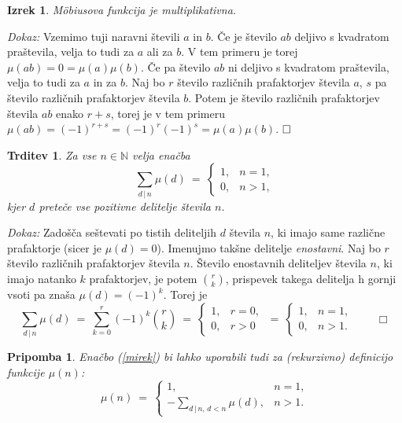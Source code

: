 \documentclass[a4paper,12pt]{article}
\def\N{\mathbb{N}} %
\def\qed{$\hfill\Box$}   %
\def\qedm{\qquad\Box}   %
\newtheorem{izrek}{Izrek}
\newtheorem{trditev}{Trditev}
\newtheorem{pripomba}{Pripomba}
\begin{document}
\begin{izrek}
\label{mimult}
M\"obiusova funkcija je multiplikativna.
\end{izrek}

\noindent
{\em Dokaz:\/} Vzemimo tuji naravni števili $a$ in $b$. Če je število $ab$ deljivo s kvadratom praštevila,
velja to tudi za $a$ ali za $b$. V tem primeru je torej $\mu(ab) = 0 = \mu(a)\mu(b)$.
Če pa število $ab$ ni deljivo s kvadratom praštevila, velja to tudi za $a$ in za $b$. Naj bo $r$ število različnih
prafaktorjev števila $a$, $s$ pa število različnih prafaktorjev števila $b$. Potem je število različnih 
prafaktorjev števila $ab$ enako $r+s$, torej je v tem primeru $\mu(ab) = (-1)^{r+s} = (-1)^r (-1)^s = \mu(a)\mu(b)$.
\qed


\begin{trditev}
Za vse $n \in \N$ velja enačba
\begin{equation}
\label{mirek}
\sum_{d\,|\,n} \mu(d)\ =\ \left\{
\begin{array}{ll}
1, & n = 1, \\
0, & n > 1,
\end{array}
\right.
\end{equation}
kjer $d$ preteče vse pozitivne delitelje števila $n$.
\end{trditev}

\noindent
{\em Dokaz:\/} 
Zadošča seštevati po tistih deliteljih $d$ števila $n$, ki imajo same različne prafaktorje (sicer je
$\mu(d) = 0$). Imenujmo takšne delitelje {\em enostavni}. Naj bo $r$ število različnih prafaktorjev
števila $n$. Število enostavnih deliteljev števila $n$, ki imajo natanko $k$ prafaktorjev, je potem ${r \choose k}$,
prispevek takega delitelja h gornji vsoti pa znaša $\mu(d) = (-1)^k$. Torej je
\[
\sum_{d\,|\,n} \mu(d)\ =\ 
\sum_{k=0}^r (-1)^k {r \choose k} \ =\ 
\left\{
\begin{array}{ll}
1, & r = 0, \\
0, & r > 0
\end{array}
\right.\ =\ \left\{
\begin{array}{ll}
1, & n = 1, \\
0, & n > 1.
\end{array}
\right. \qedm
\]

\begin{pripomba}
Enačbo (\ref{mirek}) bi lahko uporabili tudi za (rekurzivno) definicijo funkcije $\mu(n)$:
\[
\mu(n)\ =\ \left\{
\begin{array}{cl}
1, & n = 1, \\
-\displaystyle\sum_{d\,|\,n, \,d < n} \mu(d), & n > 1.
\end{array}
\right.
\]
\end{pripomba}
\end{document}
